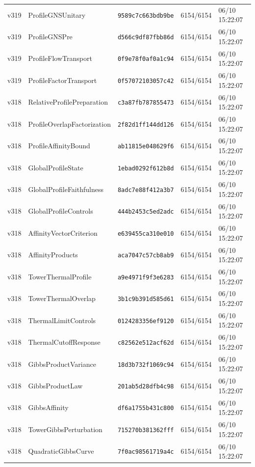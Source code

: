 \documentclass[11pt]{article}
\theoremstyle{definition}\newtheorem{deriv}{Derivação}
\begin{document}
{\begin{longtable}{@{}lllll@{}}
v319 & ProfileGNSUnitary & \texttt{9589c7c663bdb9be} & 6154/6154 & 06/10 15:22:07 \\
v319 & ProfileGNSPre & \texttt{d566c9df87fbb86d} & 6154/6154 & 06/10 15:22:07 \\
v319 & ProfileFlowTransport & \texttt{0f9e78f0af0a1c94} & 6154/6154 & 06/10 15:22:07 \\
v319 & ProfileFactorTransport & \texttt{0f57072103057c42} & 6154/6154 & 06/10 15:22:07 \\
v318 & RelativeProfilePreparation & \texttt{c3a87fb787855473} & 6154/6154 & 06/10 15:22:07 \\
v318 & ProfileOverlapFactorization & \texttt{2f82d1ff144dd126} & 6154/6154 & 06/10 15:22:07 \\
v318 & ProfileAffinityBound & \texttt{ab11815e048629f6} & 6154/6154 & 06/10 15:22:07 \\
v318 & GlobalProfileState & \texttt{1ebad0292f612b8d} & 6154/6154 & 06/10 15:22:07 \\
v318 & GlobalProfileFaithfulness & \texttt{8adc7e88f412a3b7} & 6154/6154 & 06/10 15:22:07 \\
v318 & GlobalProfileControls & \texttt{444b2453c5ed2adc} & 6154/6154 & 06/10 15:22:07 \\
v318 & AffinityVectorCriterion & \texttt{e639455ca310e010} & 6154/6154 & 06/10 15:22:07 \\
v318 & AffinityProducts & \texttt{aca7047c57cb8ab9} & 6154/6154 & 06/10 15:22:07 \\
v318 & TowerThermalProfile & \texttt{a9e4971f9f3e6283} & 6154/6154 & 06/10 15:22:07 \\
v318 & TowerThermalOverlap & \texttt{3b1c9b391d585d61} & 6154/6154 & 06/10 15:22:07 \\
v318 & ThermalLimitControls & \texttt{0124283356ef9120} & 6154/6154 & 06/10 15:22:07 \\
v318 & ThermalCutoffResponse & \texttt{c82562e512acf62d} & 6154/6154 & 06/10 15:22:07 \\
v318 & GibbsProductVariance & \texttt{18d3b732f1069c94} & 6154/6154 & 06/10 15:22:07 \\
v318 & GibbsProductLaw & \texttt{201ab5d28dfb4c98} & 6154/6154 & 06/10 15:22:07 \\
v318 & GibbsAffinity & \texttt{df6a1755b431c800} & 6154/6154 & 06/10 15:22:07 \\
v318 & TowerGibbsPerturbation & \texttt{715270b381362fff} & 6154/6154 & 06/10 15:22:07 \\
v318 & QuadraticGibbsCurve & \texttt{7f0ac98561719a4c} & 6154/6154 & 06/10 15:22:07 \\

\end{longtable}}
\end{document}
